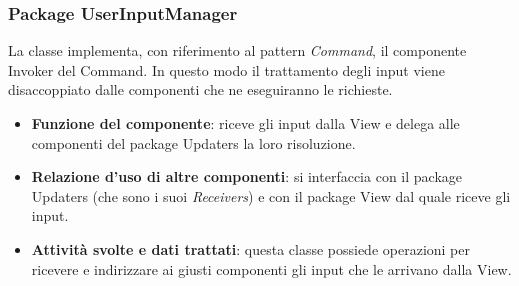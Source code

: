 \documentclass[a4paper,11pt]{article}
\begin{document}
			\subsubsection{Package UserInputManager}

			La classe implementa, con riferimento al pattern \emph{Command}, il componente Invoker del Command. In questo modo il trattamento degli input viene disaccoppiato dalle componenti che ne eseguiranno le richieste.
			\begin{itemize}
				\item\textbf{Funzione del componente}: riceve gli input dalla View e delega alle componenti del package Updaters la loro risoluzione.
				\item\textbf{Relazione d'uso di altre componenti}: si interfaccia con il package Updaters (che sono i suoi \emph{Receivers}) e con il package View dal quale riceve gli input.
				\item\textbf{Attività svolte e dati trattati}: questa classe possiede operazioni per ricevere e indirizzare ai giusti componenti gli input che le arrivano dalla View.
			\end{itemize}
			
\end{document}
